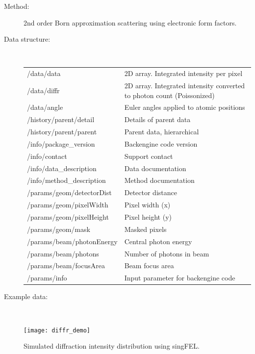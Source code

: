 \documentclass[12pt]{scrartcl}
\begin{document}
\begin{description}
  \item[Method:] 2nd order Born approximation scattering using electronic form factors.
  \item[Data structure:]\ \\
{\scriptsize%
  \begin{tabular}{l|l}
    \hline
    \hline
/data/data        & 2D array. Integrated intensity per pixel \\
/data/diffr        & 2D array. Integrated intensity converted to photon count
(Poissonized) \\
/data/angle        & Euler angles applied to atomic positions \\
/history/parent/detail        &  Details of parent data\\
/history/parent/parent        & Parent data, hierarchical \\
/info/package\_version        & Backengine code version \\
/info/contact        & Support contact \\
/info/data\_description        & Data documentation \\
/info/method\_description        & Method documentation \\
/params/geom/detectorDist        & Detector distance \\
/params/geom/pixelWidth        & Pixel width (x) \\
/params/geom/pixelHeight        & Pixel height (y) \\
/params/geom/mask        & Masked pixels \\
/params/beam/photonEnergy        & Central photon energy  \\
/params/beam/photons        & Number of photons in beam \\
/params/beam/focusArea        & Beam focus area \\
/params/info        & Input parameter for backengine code \\
\hline
\hline
\end{tabular}
}
    \item[Example data:]\ \\
      \begin{center}
        \texttt{[image: diffr\_demo]}
      \end{center}
      \scriptsize{Simulated diffraction intensity distribution using singFEL. }
\end{description}
%
\end{document}
